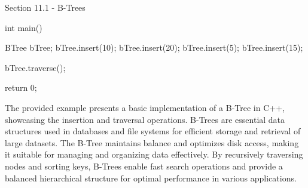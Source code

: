 \begin{notes}{Section 11.1 - B-Trees}
\begin{highlight}
\begin{code}[C++]
    int main() {
        BTree bTree;
        bTree.insert(10);
        bTree.insert(20);
        bTree.insert(5);
        bTree.insert(15);
    
        bTree.traverse();
    
        return 0;
    }
    \end{code}
        The provided example presents a basic implementation of a B-Tree in C++, showcasing the insertion and traversal operations. B-Trees are essential data structures used in databases and file systems for efficient storage and retrieval of large datasets. The B-Tree maintains balance and optimizes disk access, making it suitable for managing 
        and organizing data effectively. By recursively traversing nodes and sorting keys, B-Trees enable fast search operations and provide a balanced hierarchical structure for optimal performance in various applications.
    \end{highlight}
\end{notes}


